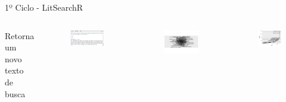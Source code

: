 \begin{frame}{1º Ciclo - LitSearchR}
	\begin{columns}
		Retorna um novo texto de busca
		\begin{figure}[hb] 
			\includegraphics[width=1.1\textwidth]{figures/litsearchr/l4.png}
		\end{figure}

		\begin{figure}[hb]
			\includegraphics[width=1\textwidth]{figures/litsearchr/l2.png}
		\end{figure}
		\begin{figure}[!ht]
			\includegraphics[width=1\textwidth]{figures/litsearchr/l3.png}
		\end{figure}
	\end{columns}
\end{frame}

